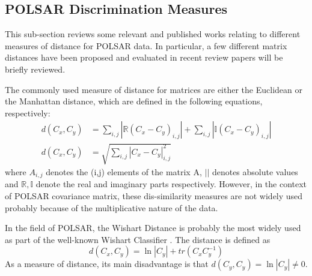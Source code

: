 \documentclass[journal]{IEEEtran}
\begin{document}
\subsection{POLSAR Discrimination Measures}

This sub-section reviews some relevant and published works relating to different measures of distance for POLSAR data. 
In particular, a few different matrix distances have been proposed and evaluated in recent review papers\cite{Dabboor_2013_IJRS_1492}\cite{Kersten_2005_TGRS_519}
will be briefly reviewed.

The commonly used measure of distance for matrices are either the Euclidean or the Manhattan distance,
  which are defined in the following equations, respectively:
\begin{align}
  d(C_x,C_y) &= \sum_{i,j} |\mathbb{R} (C_x - C_y)_{i,j}| + \sum_{i,j} |\mathbb{I} (C_x - C_y)_{i,j}| \\
  d(C_x,C_y) &= \sqrt{\sum_{i,j} |C_x - C_y|_{i,j}^2 }
\end{align}
where $A_{i,j}$ denotes the (i,j) elements of the matrix A,
 $||$ denotes absolute values
and $\mathbb{R},\mathbb{I}$ denote the real and imaginary parts respectively.
However, in the context of POLSAR covariance matrix, these dis-similarity measures are not widely used 
  probably because of the multiplicative nature of the data.

In the field of POLSAR, the Wishart Distance is probably the most widely used as part of the well-known Wishart Classifier \cite{Lee_1999_TGRS}.
The distance is defined as \cite{Lee_1994_IJRS_2299}
\begin{equation}
  d(C_x,C_y) = \ln|C_y| + tr(C_xC_y^{-1})
\end{equation}
As a measure of distance, its main disadvantage is that $d(C_y,C_y) = \ln|C_y| \neq 0$.
\end{document}

